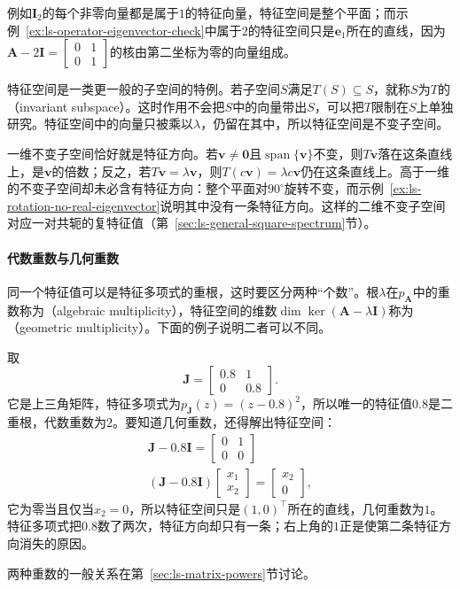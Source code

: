 例如$\bm I_2$的每个非零向量都是属于$1$的特征向量，特征空间是整个平面；而示例~\ref{ex:ls-operator-eigenvector-check}中属于$2$的特征空间只是$\bm e_1$所在的直线，因为$\bm A-2\bm I=\left[\begin{smallmatrix}0&1\\0&1\end{smallmatrix}\right]$的核由第二坐标为零的向量组成。

特征空间是一类更一般的子空间的特例。若子空间$S$满足$T(S)\subseteq S$，就称$S$为$T$的（invariant subspace）。这时作用不会把$S$中的向量带出$S$，可以把$T$限制在$S$上单独研究。特征空间中的向量只被乘以$\lambda$，仍留在其中，所以特征空间是不变子空间。

一维不变子空间恰好就是特征方向。若$\bm v\neq\bm0$且$\operatorname{span}\{\bm v\}$不变，则$T\bm v$落在这条直线上，是$\bm v$的倍数；反之，若$T\bm v=\lambda\bm v$，则$T(c\bm v)=\lambda c\bm v$仍在这条直线上。高于一维的不变子空间却未必含有特征方向：整个平面对$90^\circ$旋转不变，而示例~\ref{ex:ls-rotation-no-real-eigenvector}说明其中没有一条特征方向。这样的二维不变子空间对应一对共轭的复特征值（第~\ref{sec:ls-general-square-spectrum}节）。

\paragraph{代数重数与几何重数}
同一个特征值可以是特征多项式的重根，这时要区分两种“个数”。根$\lambda$在$p_{\bm A}$中的重数称为（algebraic multiplicity），特征空间的维数$\dim\ker(\bm A-\lambda\bm I)$称为（geometric multiplicity）。下面的例子说明二者可以不同。
\begin{example}[代数重数大于几何重数]
\label{ex:ls-multiplicity-gap}
取
\[
 \bm J=\begin{bmatrix}0.8&1\\0&0.8\end{bmatrix}.
\]
它是上三角矩阵，特征多项式为$p_{\bm J}(z)=(z-0.8)^2$，所以唯一的特征值$0.8$是二重根，代数重数为$2$。要知道几何重数，还得解出特征空间：
\[
\begin{gathered}
\bm J-0.8\bm I=\begin{bmatrix}0&1\\0&0\end{bmatrix}\\
(\bm J-0.8\bm I)\begin{bmatrix}x_1\\x_2\end{bmatrix}=\begin{bmatrix}x_2\\0\end{bmatrix},
\end{gathered}
\]
它为零当且仅当$x_2=0$，所以特征空间只是$(1,0)^{\top}$所在的直线，几何重数为$1$。特征多项式把$0.8$数了两次，特征方向却只有一条；右上角的$1$正是使第二条特征方向消失的原因。
\end{example}
两种重数的一般关系在第~\ref{sec:ls-matrix-powers}节讨论。

